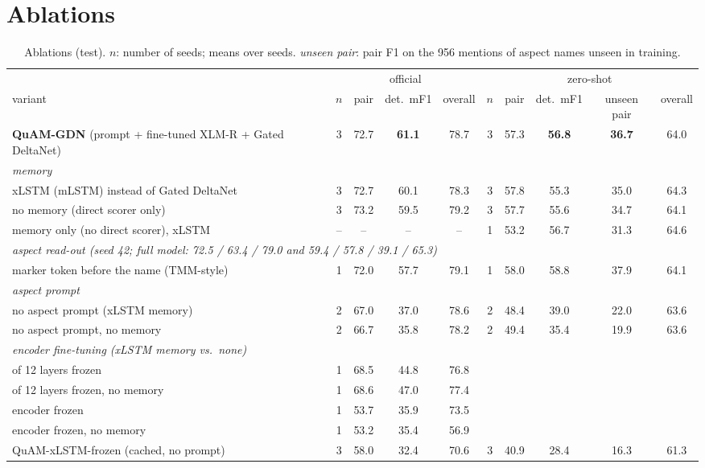 \documentclass[11pt]{article}
\newcommand{\quam}{QuAM-GDN}
\begin{document}
\section{Ablations}
\label{sec:ablation}

\begin{table}[t]
\centering\footnotesize
\setlength{\tabcolsep}{3.5pt}
\begin{tabular}{lccccccccc}
\toprule
 & \multicolumn{4}{c}{official} & \multicolumn{5}{c}{zero-shot} \\
\cmidrule(lr){2-5}\cmidrule(lr){6-10}
variant & $n$ & pair & det.\ mF1 & overall & $n$ & pair & det.\ mF1 & unseen pair & overall \\
\midrule
\textbf{\quam{}} (prompt + fine-tuned XLM-R + Gated DeltaNet) & 3 & 72.7 & \textbf{61.1} & 78.7 & 3 & 57.3 & \textbf{56.8} & \textbf{36.7} & 64.0 \\
\midrule
\multicolumn{10}{l}{\textit{memory}} \\
\quad xLSTM (mLSTM) instead of Gated DeltaNet & 3 & 72.7 & 60.1 & 78.3 & 3 & 57.8 & 55.3 & 35.0 & 64.3 \\
\quad no memory (direct scorer only)            & 3 & 73.2 & 59.5 & 79.2 & 3 & 57.7 & 55.6 & 34.7 & 64.1 \\
\quad memory only (no direct scorer), xLSTM     & -- & -- & -- & -- & 1 & 53.2 & 56.7 & 31.3 & 64.6 \\
\multicolumn{10}{l}{\textit{aspect read-out (seed 42; full model: 72.5 / 63.4 / 79.0 and 59.4 / 57.8 / 39.1 / 65.3)}} \\
\quad marker token before the name (TMM-style)   & 1 & 72.0 & 57.7 & 79.1 & 1 & 58.0 & 58.8 & 37.9 & 64.1 \\
\multicolumn{10}{l}{\textit{aspect prompt}} \\
\quad no aspect prompt (xLSTM memory)            & 2 & 67.0 & 37.0 & 78.6 & 2 & 48.4 & 39.0 & 22.0 & 63.6 \\
\quad no aspect prompt, no memory                & 2 & 66.7 & 35.8 & 78.2 & 2 & 49.4 & 35.4 & 19.9 & 63.6 \\
\multicolumn{10}{l}{\textit{encoder fine-tuning (xLSTM memory vs.\ none)}} \\
\quad 9 of 12 layers frozen                      & 1 & 68.5 & 44.8 & 76.8 & & & & & \\
\quad 9 of 12 layers frozen, no memory           & 1 & 68.6 & 47.0 & 77.4 & & & & & \\
\quad encoder frozen                             & 1 & 53.7 & 35.9 & 73.5 & & & & & \\
\quad encoder frozen, no memory                  & 1 & 53.2 & 35.4 & 56.9 & & & & & \\
\quad QuAM-xLSTM-frozen (cached, no prompt)      & 3 & 58.0 & 32.4 & 70.6 & 3 & 40.9 & 28.4 & 16.3 & 61.3 \\
\bottomrule
\end{tabular}
\caption{Ablations (test). $n$: number of seeds; means over seeds. \emph{unseen pair}: pair F1 on the
956 mentions of aspect names unseen in training.}
\label{tab:ablation}
\end{table}
\end{document}
